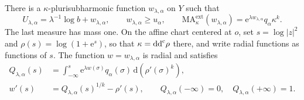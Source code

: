 \begin{lemma}\label{lem:radial-greatest-separated}
There is a $\kappa$-plurisubharmonic function $w_{\lambda,\alpha}$ on $Y$ such that
\[
 U_{\lambda,\alpha}=\lambda^{-1}\log b+w_{\lambda,\alpha},\qquad
 w_{\lambda,\alpha}\geq u_\alpha,
 \qquad
 \mathrm{MA}^{\mathrm{ext}}_\kappa(w_{\lambda,\alpha})
       =\mathrm e^{\lambda w_{\lambda,\alpha}}q_\alpha\kappa^k.
\]
The last measure has mass one. On the affine chart centered at $o$, set $s=\log|z|^2$ and $\rho(s)=\log(1+\mathrm e^s)$, so that $\kappa=\mathrm{dd}^{\mathrm{c}}\rho$ there, and write radial functions as functions of $s$. The function $w=w_{\lambda,\alpha}$ is radial and satisfies
\begin{equation}\label{eq:radial-selection-flux}
 \begin{aligned}
 Q_{\lambda,\alpha}(s)
   &=\int_{-\infty}^s\mathrm e^{\lambda w(\sigma)}q_\alpha(\sigma)\,
                                      \mathrm d(\rho'(\sigma)^k),\\
 w'(s)&=Q_{\lambda,\alpha}(s)^{1/k}-\rho'(s),
 \qquad Q_{\lambda,\alpha}(-\infty)=0,
 \quad Q_{\lambda,\alpha}(+\infty)=1.
 \end{aligned}
\end{equation}
\end{lemma}
